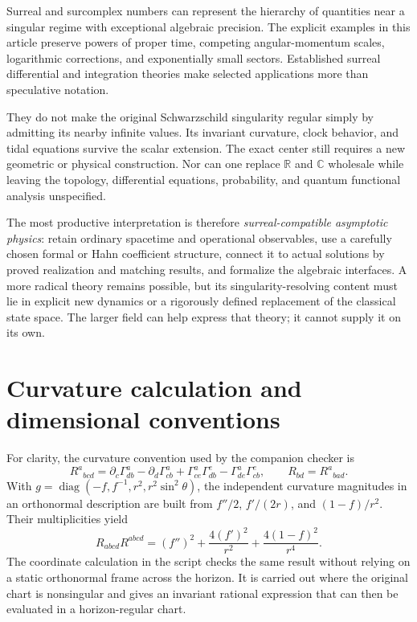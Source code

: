 \documentclass[11pt,letterpaper]{article}
\newcommand{\R}{\mathbb{R}}
\newcommand{\C}{\mathbb{C}}
\newcommand{\diag}{\operatorname{diag}}
\theoremstyle{definition}
\theoremstyle{remark}
\begin{document}
Surreal and surcomplex numbers can represent the hierarchy of quantities near
a singular regime with exceptional algebraic precision. The explicit examples
in this article preserve powers of proper time, competing angular-momentum
scales, logarithmic corrections, and exponentially small sectors. Established
surreal differential and integration theories make selected applications more
than speculative notation.

They do not make the original Schwarzschild singularity regular simply by
admitting its nearby infinite values. Its invariant curvature, clock behavior,
and tidal equations survive the scalar extension. The exact center still
requires a new geometric or physical construction. Nor can one replace $\R$
and $\C$ wholesale while leaving the topology, differential equations,
probability, and quantum functional analysis unspecified.

The most productive interpretation is therefore \emph{surreal-compatible
asymptotic physics}: retain ordinary spacetime and operational observables,
use a carefully chosen formal or Hahn coefficient structure, connect it to
actual solutions by proved realization and matching results, and formalize
the algebraic interfaces. A more radical theory remains possible, but its
singularity-resolving content must lie in explicit new dynamics or a rigorously
defined replacement of the classical state space. The larger field can help
express that theory; it cannot supply it on its own.

\appendix
\section{Curvature calculation and dimensional conventions}
\label{app:curvature}

For clarity, the curvature convention used by the companion checker is
\[
 R^a{}_{bcd}=\partial_c\Gamma^a_{db}-\partial_d\Gamma^a_{cb}
       +\Gamma^a_{ce}\Gamma^e_{db}-\Gamma^a_{de}\Gamma^e_{cb},
 \qquad R_{bd}=R^a{}_{bad}.
\]
With $g=\diag(-f,f^{-1},r^2,r^2\sin^2\theta)$, the independent curvature
magnitudes in an orthonormal description are built from $f''/2$, $f'/(2r)$,
and $(1-f)/r^2$. Their multiplicities yield
\[
 R_{abcd}R^{abcd}=(f'')^2+\frac{4(f')^2}{r^2}
                        +\frac{4(1-f)^2}{r^4}.
\]
The coordinate calculation in the script checks the same result without
relying on a static orthonormal frame across the horizon. It is carried out
where the original chart is nonsingular and gives an invariant rational
expression that can then be evaluated in a horizon-regular chart.
\end{document}
